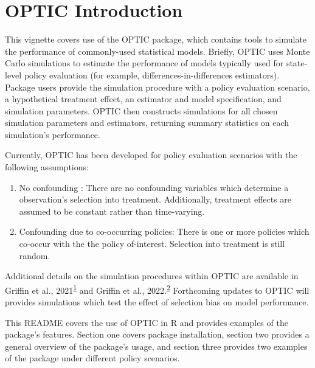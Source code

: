 \documentclass[
]{article}
\author{}
\date{\vspace{-2.5em}}
\providecommand{\tightlist}{%
  \setlength{\itemsep}{0pt}\setlength{\parskip}{0pt}}
\begin{document}
{
\hypersetup{linkcolor=}
\setcounter{tocdepth}{2}
\tableofcontents
}
\hypertarget{optic-introduction}{%
\section*{OPTIC Introduction}\label{optic-introduction}}

This vignette covers use of the OPTIC package, which contains tools to
simulate the performance of commonly-used statistical models. Briefly,
OPTIC uses Monte Carlo simulations to estimate the performance of models
typically used for state-level policy evaluation (for example,
differences-in-differences estimators). Package users provide the
simulation procedure with a policy evaluation scenario, a hypothetical
treatment effect, an estimator and model specification, and simulation
parameters. OPTIC then constructs simulations for all chosen simulation
parameters and estimators, returning summary statistics on each
simulation's performance.

Currently, OPTIC has been developed for policy evaluation scenarios with
the following assumptions:

\begin{enumerate}
\def\labelenumi{\arabic{enumi}.}
\tightlist
\item
  No confounding : There are no confounding variables which determine a
  observation's selection into treatment. Additionally, treatment
  effects are assumed to be constant rather than time-varying.
\item
  Confounding due to co-occurring policies: There is one or more
  policies which co-occur with the the policy of-interest. Selection
  into treatment is still random.
\end{enumerate}

Additional details on the simulation procedures within OPTIC are
available in Griffin et al.,
2021\textsuperscript{\protect\hyperlink{ref-http:ux2fux2fzotero.orgux2fusersux2f3390799ux2fitemsux2fZNCVTPJF}{1}}
and Griffin et al.,
2022.\textsuperscript{\protect\hyperlink{ref-http:ux2fux2fzotero.orgux2fusersux2f3390799ux2fitemsux2fV3Q6ARUA}{2}}
Forthcoming updates to OPTIC will provides simulations which test the
effect of selection bias on model performance.

This README covers the use of OPTIC in R and provides examples of the
package's features. Section one covers package installation, section two
provides a general overview of the package's usage, and section three
provides two examples of the package under different policy scenarios.
\end{document}
